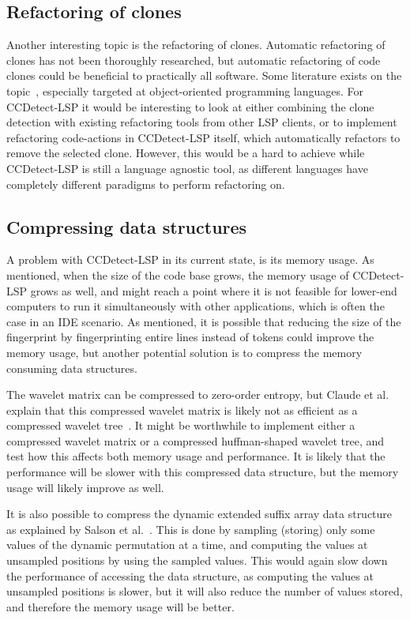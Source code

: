 \subsection*{Refactoring of clones}

Another interesting topic is the refactoring of clones. Automatic refactoring of clones
has not been thoroughly researched, but automatic refactoring of code clones could be
beneficial to practically all software. Some literature exists on the
topic~\cite{TowardsAutomatedRefactoring, RefactoringOrientedClones}, especially targeted
at object-oriented programming languages. For CCDetect-LSP it would be interesting to look
at either combining the clone detection with existing refactoring tools from other LSP
clients, or to implement refactoring code-actions in CCDetect-LSP itself, which
automatically refactors to remove the selected clone. However, this would be a hard to
achieve while CCDetect-LSP is still a language agnostic tool, as different languages have
completely different paradigms to perform refactoring on.

\subsection*{Compressing data structures}

A problem with CCDetect-LSP in its current state, is its memory usage. As mentioned, when
the size of the code base grows, the memory usage of CCDetect-LSP grows as well, and might
reach a point where it is not feasible for lower-end computers to run it simultaneously
with other applications, which is often the case in an IDE scenario. As mentioned, it is
possible that reducing the size of the fingerprint by fingerprinting entire lines instead
of tokens could improve the memory usage, but another potential solution is to compress
the memory consuming data structures. 

The wavelet matrix can be compressed to zero-order entropy, but Claude et al. explain that
this compressed wavelet matrix is likely not as efficient as a compressed wavelet
tree~\cite{WaveletMatrix}. It might be worthwhile to implement either a compressed wavelet
matrix or a compressed huffman-shaped wavelet tree, and test how this affects both memory
usage and performance. It is likely that the performance will be slower with this
compressed data structure, but the memory usage will likely improve as well.

It is also possible to compress the dynamic extended suffix array data structure as
explained by Salson et al.~\cite{DynamicExtendedSuffixArrays}. This is done by sampling
(storing) only some values of the dynamic permutation at a time, and computing the values
at unsampled positions by using the sampled values. This would again slow down the
performance of accessing the data structure, as computing the values at unsampled
positions is slower, but it will also reduce the number of values stored, and therefore
the memory usage will be better.

